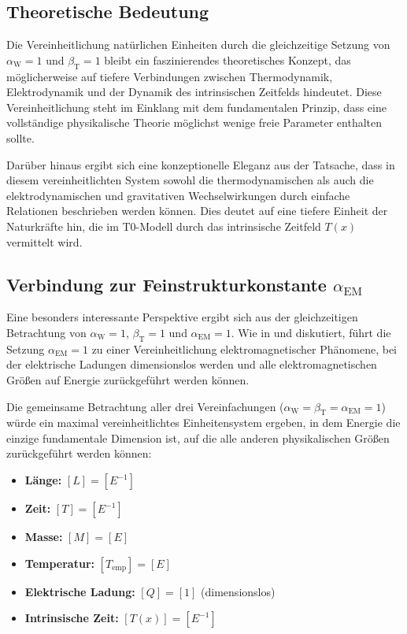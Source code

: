 \documentclass[12pt,a4paper]{article}
\newcommand{\Tfield}{T(x)}
\newcommand{\betaT}{\beta_{\text{T}}}
\newcommand{\alphaEM}{\alpha_{\text{EM}}}
\newcommand{\alphaW}{\alpha_{\text{W}}}
\begin{document}
	\subsection{Theoretische Bedeutung}
	
	Die Vereinheitlichung natürlichen Einheiten durch die gleichzeitige Setzung von \(\alphaW = 1\) und \(\betaT = 1\) bleibt ein faszinierendes theoretisches Konzept, das möglicherweise auf tiefere Verbindungen zwischen Thermodynamik, Elektrodynamik und der Dynamik des intrinsischen Zeitfelds hindeutet. Diese Vereinheitlichung steht im Einklang mit dem fundamentalen Prinzip, dass eine vollständige physikalische Theorie möglichst wenige freie Parameter enthalten sollte.
	
	Darüber hinaus ergibt sich eine konzeptionelle Eleganz aus der Tatsache, dass in diesem vereinheitlichten System sowohl die thermodynamischen als auch die elektrodynamischen und gravitativen Wechselwirkungen durch einfache Relationen beschrieben werden können. Dies deutet auf eine tiefere Einheit der Naturkräfte hin, die im T0-Modell durch das intrinsische Zeitfeld \(\Tfield\) vermittelt wird.
	
	\subsection{Verbindung zur Feinstrukturkonstante \(\alphaEM\)}
	
	Eine besonders interessante Perspektive ergibt sich aus der gleichzeitigen Betrachtung von \(\alphaW = 1\), \(\betaT = 1\) und \(\alphaEM = 1\). Wie in \cite{pascher_alpha_2025} und \cite{pascher_alphabeta_2025} diskutiert, führt die Setzung \(\alphaEM = 1\) zu einer Vereinheitlichung elektromagnetischer Phänomene, bei der elektrische Ladungen dimensionslos werden und alle elektromagnetischen Größen auf Energie zurückgeführt werden können.
	
	Die gemeinsame Betrachtung aller drei Vereinfachungen (\(\alphaW = \betaT = \alphaEM = 1\)) würde ein maximal vereinheitlichtes Einheitensystem ergeben, in dem Energie die einzige fundamentale Dimension ist, auf die alle anderen physikalischen Größen zurückgeführt werden können:
	
	\begin{tcolorbox}[colback=blue!5!white,colframe=blue!75!black,title=Vollständig vereinheitlichtes Einheitensystem]
		\begin{itemize}
			\item \textbf{Länge:} \([L] = [E^{-1}]\)
			\item \textbf{Zeit:} \([T] = [E^{-1}]\)
			\item \textbf{Masse:} \([M] = [E]\)
			\item \textbf{Temperatur:} \([T_{\text{emp}}] = [E]\)
			\item \textbf{Elektrische Ladung:} \([Q] = [1]\) (dimensionslos)
			\item \textbf{Intrinsische Zeit:} \([\Tfield] = [E^{-1}]\)
		\end{itemize}
	\end{tcolorbox}
	
\end{document}
